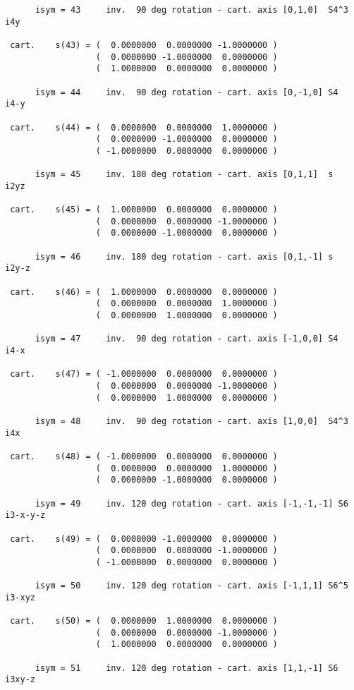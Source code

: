 \documentclass[12pt,a4paper,twoside]{report}
\begin{document}
\begin{tcolorbox}
\begin{scriptsize}
\begin{verbatim}
      isym = 43     inv.  90 deg rotation - cart. axis [0,1,0]  S4^3   i4y

 cart.    s(43) = (  0.0000000  0.0000000 -1.0000000 )
                  (  0.0000000 -1.0000000  0.0000000 )
                  (  1.0000000  0.0000000  0.0000000 )

      isym = 44     inv.  90 deg rotation - cart. axis [0,-1,0] S4     i4-y

 cart.    s(44) = (  0.0000000  0.0000000  1.0000000 )
                  (  0.0000000 -1.0000000  0.0000000 )
                  ( -1.0000000  0.0000000  0.0000000 )

      isym = 45     inv. 180 deg rotation - cart. axis [0,1,1]  s      i2yz

 cart.    s(45) = (  1.0000000  0.0000000  0.0000000 )
                  (  0.0000000  0.0000000 -1.0000000 )
                  (  0.0000000 -1.0000000  0.0000000 )

      isym = 46     inv. 180 deg rotation - cart. axis [0,1,-1] s      i2y-z

 cart.    s(46) = (  1.0000000  0.0000000  0.0000000 )
                  (  0.0000000  0.0000000  1.0000000 )
                  (  0.0000000  1.0000000  0.0000000 )

      isym = 47     inv.  90 deg rotation - cart. axis [-1,0,0] S4     i4-x

 cart.    s(47) = ( -1.0000000  0.0000000  0.0000000 )
                  (  0.0000000  0.0000000 -1.0000000 )
                  (  0.0000000  1.0000000  0.0000000 )

      isym = 48     inv.  90 deg rotation - cart. axis [1,0,0]  S4^3   i4x

 cart.    s(48) = ( -1.0000000  0.0000000  0.0000000 )
                  (  0.0000000  0.0000000  1.0000000 )
                  (  0.0000000 -1.0000000  0.0000000 )

      isym = 49     inv. 120 deg rotation - cart. axis [-1,-1,-1] S6   i3-x-y-z

 cart.    s(49) = (  0.0000000 -1.0000000  0.0000000 )
                  (  0.0000000  0.0000000 -1.0000000 )
                  ( -1.0000000  0.0000000  0.0000000 )

      isym = 50     inv. 120 deg rotation - cart. axis [-1,1,1] S6^5   i3-xyz

 cart.    s(50) = (  0.0000000  1.0000000  0.0000000 )
                  (  0.0000000  0.0000000 -1.0000000 )
                  (  1.0000000  0.0000000  0.0000000 )

      isym = 51     inv. 120 deg rotation - cart. axis [1,1,-1] S6     i3xy-z


\end{verbatim}
\end{scriptsize}
\end{tcolorbox}
\end{document}
